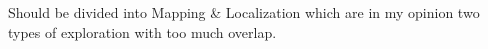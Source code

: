 
Should be divided into Mapping \& Localization which are in my opinion two types of exploration with too much overlap.